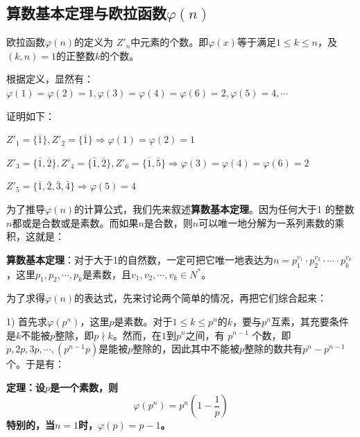 \documentclass[12pt]{article}
\begin{document}
\subsection{算数基本定理与欧拉函数$\varphi(n)$}
欧拉函数$\varphi(n)$的定义为 $Z'_n$中元素的个数。即$\varphi(x)$等于满足$1\le k \le n$，及$(k,n)=1$的正整数$k$的个数。

根据定义，显然有：$\varphi(1) = \varphi(2) = 1, \varphi(3) = \varphi(4) = \varphi(6) = 2, \varphi(5) = 4, \cdots$

\begin{framed}
\small {
证明如下：

$ Z'_1 = \{\bar{1}\}, Z'_2 = \{\bar{1}\} \Rightarrow \varphi(1) = \varphi(2) = 1 $

$ Z'_3 = \{\bar{1}, \bar{2}\}, Z'_4 = \{\bar{1}, \bar{2}\}, Z'_6 = \{\bar{1}, \bar{5}\} \Rightarrow \varphi(3) = \varphi(4) = \varphi(6) = 2 $

$ Z'_5 = \{\bar{1}, \bar{2}, \bar{3}, \bar{4}\} \Rightarrow \varphi(5) = 4 $
}
\end{framed}

为了推导$\varphi(n)$的计算公式，我们先来叙述\textbf{算数基本定理}。因为任何大于1 的整数$n$都或是合数或是素数。而如果$n$是合数，则$n$可以唯一地分解为一系列素数的乘积，这就是：

\begin{mdframed}[
linecolor=black!40,outerlinewidth=1pt,roundcorner=.5em,innertopmargin=1ex,innerbottommargin=.5\baselineskip,innerrightmargin=1em,innerleftmargin=1em,backgroundcolor=gray!5,
]
\textbf{算数基本定理}：对于大于1的自然数，一定可把它唯一地表达为$n = p_1^{v_1} \cdot p_2^{v_2} \cdot \cdots \cdot p_k^{v_k}$，这里$p_1, p_2, \cdots, p_k$是素数，且$v_1, v_2, \cdots, v_k \in N^*$。
\end{mdframed}

为了求得$\varphi(n)$的表达式，先来讨论两个简单的情况，再把它们综合起来：

1) 首先求$\varphi(p^n)$，这里$p$是素数。对于$1 \le k \le p^n$的$k$，要与$p^n$互素，其充要条件是$k$不能被$p$整除，即$p \nmid k$。然而，在$1$到$p^n$之间，有 $p^{n-1}$ 个数，即$p, 2p, 3p, \cdots, (p^{n-1}p)$是能被$p$整除的，因此其中不能被$p$整除的数共有$p^n - p^{n-1}$个。于是有：

\begin{mdframed}[
linecolor=black!40,outerlinewidth=1pt,roundcorner=.5em,innertopmargin=1ex,innerbottommargin=.5\baselineskip,innerrightmargin=1em,innerleftmargin=1em,backgroundcolor=gray!5,
]
\textbf{定理：设$p$是一个素数，则
$$
\varphi(p^n) = p^n(1 - \frac{1}{p})
$$
特别的，当$n=1$时，$\varphi(p) = p - 1$。}
\end{mdframed}
\end{document}
